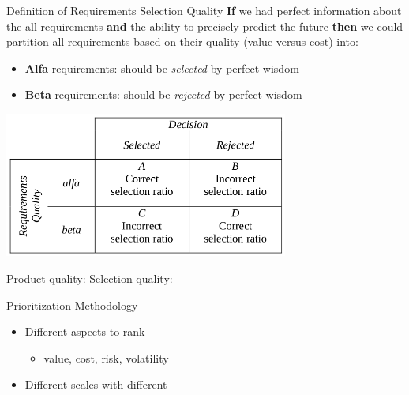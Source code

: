 \documentclass{beamer}
\begin{document}
\begin{frame}[fragile]{Definition of Requirements Selection Quality}
\footnotesize
\textbf{If} we had perfect information about the all requirements \textbf{and} the ability to precisely predict the future \textbf{then} we could partition all requirements based on their quality (value versus cost) into:
\begin{itemize}\footnotesize
\item \textbf{Alfa}-requirements: should be \textit{selected} by perfect wisdom
\item \textbf{Beta}-requirements: should be \textit{rejected} by perfect wisdom
\end{itemize}
\begin{center}
\includegraphics[width=0.7\textwidth]{img/alfa-beta-reqts}
\end{center}
{
Product quality: \hfill
Selection quality:
}
\end{frame}


\begin{frame}[fragile]{Prioritization Methodology}

\begin{itemize}
\item Different aspects to rank
\begin{itemize}
  \item value, cost, risk, volatility 
\end{itemize}
\item Different scales with different 
\end{itemize}
\end{frame}
\end{document}
